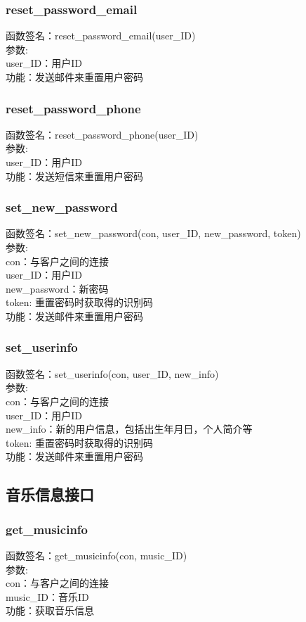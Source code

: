 \subsubsection{reset\_password\_email}
\noindent
函数签名：reset\_password\_email(user\_ID)\\
参数:\\
user\_ID：用户ID\\
功能：发送邮件来重置用户密码

\subsubsection{reset\_password\_phone}
\noindent
函数签名：reset\_password\_phone(user\_ID)\\
参数:\\
user\_ID：用户ID\\
功能：发送短信来重置用户密码

\subsubsection{set\_new\_password}
\noindent
函数签名：set\_new\_password(con, user\_ID, new\_password, token)\\
参数:\\
con：与客户之间的连接\\
user\_ID：用户ID\\
new\_password：新密码\\
token: 重置密码时获取得的识别码\\
功能：发送邮件来重置用户密码

\subsubsection{set\_userinfo}
\noindent
函数签名：set\_userinfo(con, user\_ID, new\_info)\\
参数:\\
con：与客户之间的连接\\
user\_ID：用户ID\\
new\_info：新的用户信息，包括出生年月日，个人简介等\\
token: 重置密码时获取得的识别码\\
功能：发送邮件来重置用户密码


\subsection{音乐信息接口}


\subsubsection{get\_musicinfo}
\noindent
函数签名：get\_musicinfo(con, music\_ID)\\
参数:\\
con：与客户之间的连接\\
music\_ID：音乐ID\\
功能：获取音乐信息

